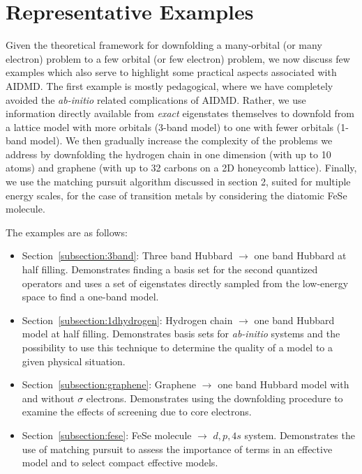 \section{Representative Examples}

Given the theoretical framework for downfolding a many-orbital (or many electron) problem to a 
few orbital (or few electron) problem, we now discuss few examples which also serve to highlight some practical aspects 
associated with AIDMD. The first example is mostly pedagogical, 
where we have completely avoided the \textit{ab-initio} related complications of AIDMD. Rather, we use information directly available 
from \textit{exact} eigenstates themselves to downfold from a lattice model with more orbitals (3-band model) 
to one with fewer orbitals (1-band model). We then gradually increase the complexity of the problems we address 
by downfolding the hydrogen chain in one dimension (with up to 10 atoms) and graphene 
(with up to 32 carbons on a 2D honeycomb lattice). Finally, we use the matching pursuit algorithm discussed 
in section 2, suited for multiple energy scales, for the case of transition metals 
by considering the diatomic FeSe molecule.

The examples are as follows:
\begin{itemize}
\item Section~\ref{subsection:3band}: Three band Hubbard $\rightarrow$ one band Hubbard at half filling. Demonstrates finding a basis set for the second quantized operators and uses a set of eigenstates directly sampled from the low-energy space to find a one-band model.
\item Section~\ref{subsection:1dhydrogen}: Hydrogen chain $\rightarrow$ one band Hubbard model at half filling. Demonstrates basis sets for {\it ab-initio} systems and the possibility to use this technique to determine the quality of a model to a given physical situation.
\item Section~\ref{subsection:graphene}: Graphene $\rightarrow$ one band Hubbard model with and without $\sigma$ electrons. Demonstrates using the downfolding procedure to examine the effects of screening due to core electrons. 
\item Section~\ref{subsection:fese}: FeSe molecule $\rightarrow$ $d,p,4s$ system. Demonstrates the use of matching pursuit to assess the importance of terms in an effective model and to select compact effective models.
\end{itemize}



